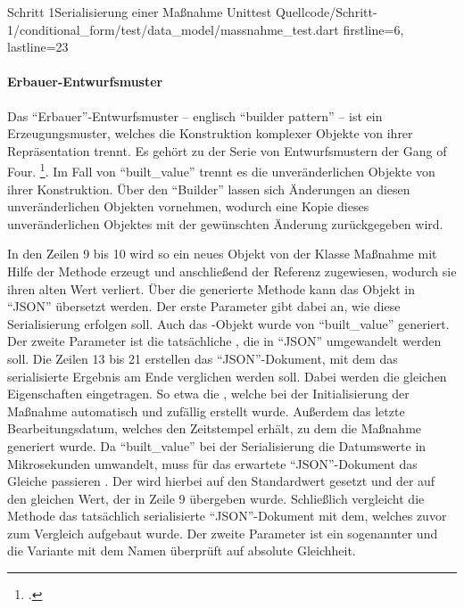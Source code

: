 \begin{alexlisting}{Schritt 1}{Serialisierung einer Maßnahme Unittest}
  {Quellcode/Schritt-1/conditional_form/test/data_model/massnahme_test.dart}
  {firstline=6, lastline=23}
  \label{lst:SerialisierungEinerMassnahmeUnittest}
\end{alexlisting}

\paragraph{Erbauer-Entwurfsmuster} Das \enquote{Erbauer}-Entwurfsmuster -- englisch \enquote{builder pattern} -- ist ein Erzeugungsmuster, welches die Konstruktion komplexer Objekte von ihrer Repräsentation trennt.
Es gehört zu der Serie von Entwurfsmustern der Gang of Four. \footcite[Vgl.][S. 119]{gamma2009entwurfsmuster}.
Im Fall von \enquote{built_value} trennt es die unveränderlichen Objekte von ihrer Konstruktion.
Über den \enquote{Builder} lassen sich Änderungen an diesen unveränderlichen Objekten vornehmen, wodurch eine Kopie dieses unveränderlichen Objektes mit der gewünschten Änderung zurückgegeben wird.

In den Zeilen 9 bis 10 wird so ein neues Objekt von der Klasse Maßnahme mit Hilfe der Methode  erzeugt und anschließend der Referenz  zugewiesen, wodurch sie ihren alten Wert verliert.
Über die generierte Methode   kann das Objekt in \enquote{JSON} übersetzt werden.
Der erste Parameter  gibt dabei an, wie diese Serialisierung erfolgen soll. Auch das -Objekt wurde von \enquote{built_value} generiert.
Der zweite Parameter ist die tatsächliche , die in \enquote{JSON} umgewandelt werden soll.
Die Zeilen 13 bis 21 erstellen das \enquote{JSON}-Dokument, mit dem das serialisierte Ergebnis am Ende verglichen werden soll. Dabei werden die gleichen Eigenschaften eingetragen.
So etwa die , welche bei der Initialisierung der Maßnahme automatisch und zufällig erstellt wurde. Außerdem das letzte Bearbeitungsdatum, welches den Zeitstempel erhält, zu dem die Maßnahme generiert wurde.
Da \enquote{built_value} bei der Serialisierung die Datumswerte in Mikrosekunden umwandelt, muss für das erwartete \enquote{JSON}-Dokument das Gleiche passieren .
Der   wird hierbei auf den Standardwert  gesetzt und der   auf den gleichen Wert, der in Zeile 9 übergeben wurde.
Schließlich vergleicht die Methode  das tatsächlich serialisierte \enquote{JSON}-Dokument mit dem, welches zuvor zum Vergleich aufgebaut wurde.
Der zweite Parameter ist ein sogenannter  und die Variante mit dem Namen  überprüft auf absolute Gleichheit.



